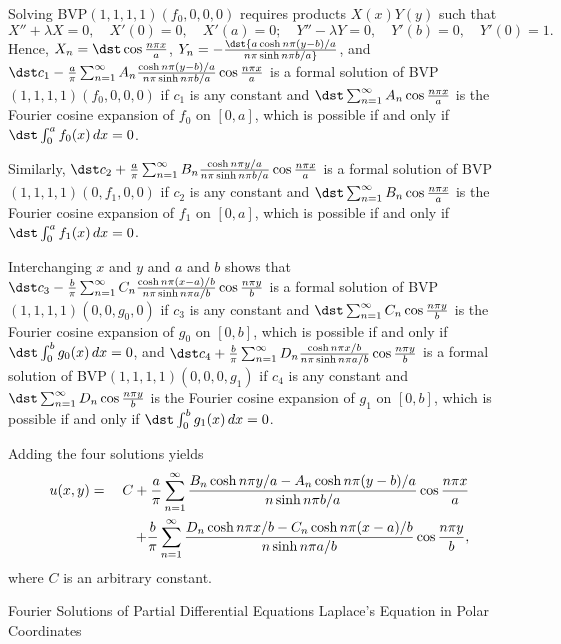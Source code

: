\documentclass[dvips]{book}
\renewcommand{\exer}[1]{\par\medskip\;\noindent{\color{red}\bf #1.}}
\numberwithin{example}{section}
\numberwithin{equation}{section}
\numberwithin{theorem}{section}
\numberwithin{table}{section}
\numberwithin{figure}{section}
\begin{document}
\exer{12.3.36}
Solving  BVP$(1,1,1,1)(f_0,0,0,0)$ requires
products $X(x)Y(y)$ such that
$$
X''+\lambda X=0,\quad X'(0)=0,\quad X'(a)=0;
\quad Y''-\lambda Y=0,\quad  Y'(b)=0,\quad Y'(0)=1.
$$
Hence, $X_n=\dst\cos{n\pi x\over a}$,
$Y_n=-\dst{a\cosh n\pi(y-b)/a\over n\pi\sinh n\pi b/a}$,
 and
$\dst c_1-{a\over\pi}\sum_{n=1}^\infty A_n{\cosh n\pi(y-b)/a\over
n\pi\sinh n\pi b/a}
\cos{n\pi x\over a}$
is a formal solution of  BVP$(1,1,1,1)(f_0,0,0,0)$ if $c_1$
is any constant  and $\dst\sum_{n=1}^\infty A_n\cos{n\pi x\over a}$
is the Fourier cosine expansion of $f_0$ on $[0,a]$, which is possible
if and only if $\dst\int_0^af_0(x)\,dx=0$.

Similarly,
$\dst c_2+{a\over\pi}\sum_{n=1}^\infty B_n{\cosh n\pi y/a\over
n\pi\sinh n\pi b/a}
\cos{n\pi x\over a}$
is a formal solution of  BVP$(1,1,1,1)(0,f_1,0,0)$ if $c_2$
is any constant  and $\dst\sum_{n=1}^\infty B_n\cos{n\pi x\over a}$
is the Fourier cosine expansion of $f_1$ on $[0,a]$, which is possible
if and only if $\dst\int_0^af_1(x)\,dx=0$.

 Interchanging $x$ and $y$ and $a$ and $b$ shows that
$\dst c_3-{b\over\pi}\sum_{n=1}^\infty C_n{\cosh n\pi(x-a)/b\over
n\pi\sinh n\pi a/b}
\cos{n\pi y\over b}$
is a formal solution of  BVP$(1,1,1,1)(0,0,g_0,0)$ if $c_3$
is any constant  and $\dst\sum_{n=1}^\infty C_n\cos{n\pi y\over b}$
is the Fourier cosine expansion of $g_0$ on $[0,b]$, which is
possible if and only if $\dst\int_0^bg_0(x)\,dx=0$, and
$\dst c_4+{b\over\pi}\sum_{n=1}^\infty D_n{\cosh n\pi x/b\over
n\pi\sinh n\pi a/b}
\cos{n\pi y\over b}$
is a formal solution of  BVP$(1,1,1,1)(0,0,0,g_1)$ if $c_4$
is any constant  and $\dst\sum_{n=1}^\infty D_n\cos{n\pi y\over b}$
is the Fourier cosine expansion of $g_1$ on $[0,b]$, which is
possible if and only if $\dst\int_0^bg_1(x)\,dx=0$.

Adding the four solutions yields
\begin{eqnarray*}
u(x,y)&=&C+
{a\over\pi}\sum_{n=1}^\infty{B_n\cosh n\pi y/a-A_n\cosh
n\pi(y-b)/a\over n\sinh n\pi b/a}\cos{n\pi x\over a}\\
&&
\hspace*{1.25em}+{b\over\pi}\sum_{n=1}^\infty{D_n\cosh n\pi
x/b-C_n\cosh n\pi(x-a)/b\over n\sinh n\pi a/b}\cos{n\pi y\over b},
\end{eqnarray*}
where $C$  is an arbitrary constant.


 {Fourier Solutions of Partial Differential Equations}
{Laplace's Equation in Polar Coordinates}
\end{document}
